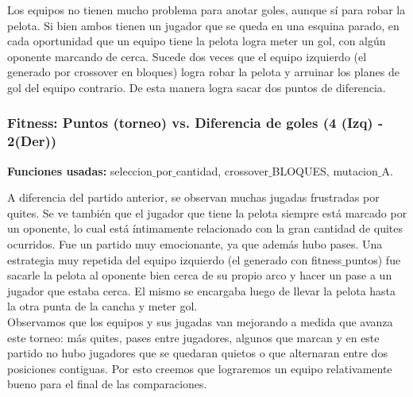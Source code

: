 Los equipos no tienen mucho problema para anotar goles, aunque sí para robar la pelota.
Si bien ambos tienen un jugador que se queda en una esquina parado, en cada oportunidad que un equipo tiene la pelota logra meter un gol, con algún oponente marcando de cerca.
Sucede dos veces que el equipo izquierdo (el generado por crossover en bloques) logra robar la pelota y arruinar los planes de gol del equipo contrario. De esta manera logra sacar dos puntos de diferencia.


\subsubsection*{Fitness: Puntos (torneo) vs. Diferencia de goles (4 (Izq) - 2(Der))}

\textbf{Funciones usadas: } seleccion$\_$por$\_$cantidad, crossover$\_$BLOQUES, mutacion$\_$A.



A diferencia del partido anterior, se observan muchas jugadas frustradas por quites.
Se ve también que el jugador que tiene la pelota siempre está marcado por un oponente, lo cual está íntimamente relacionado con la gran cantidad de quites ocurridos.
Fue un partido muy emocionante, ya que además hubo pases.
Una estrategia muy repetida del equipo izquierdo (el generado con fitness$\_$puntos) fue sacarle la pelota al oponente bien cerca de su propio arco y hacer un pase a un jugador que estaba cerca.
El mismo se encargaba luego de llevar la pelota hasta la otra punta de la cancha y meter gol.\\

Observamos que los equipos y sus jugadas van mejorando a medida que avanza este torneo: más quites, pases entre jugadores, algunos que marcan y en este partido no hubo jugadores que se quedaran quietos o que alternaran entre dos posiciones contiguas.
Por esto creemos que lograremos un equipo relativamente bueno para el final de las comparaciones.


